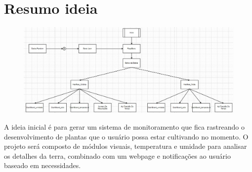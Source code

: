 \documentclass[../main.tex]{subfiles}
\begin{document}
\section{Resumo ideia}
\begin{figure}[H]
\centering
\includegraphics[scale=0.35]{../../UML image.jpeg}
\end{figure}

A ideia inicial é para gerar um sistema de monitoramento que fica rastreando o desenvolvimento de plantas que o usuário possa estar cultivando no momento. \newline
O projeto será composto de módulos visuais, temperatura e umidade para analisar os detalhes da terra, combinado com um webpage e notificações ao usuário baseado em necessidades. \newline
\end{document}
